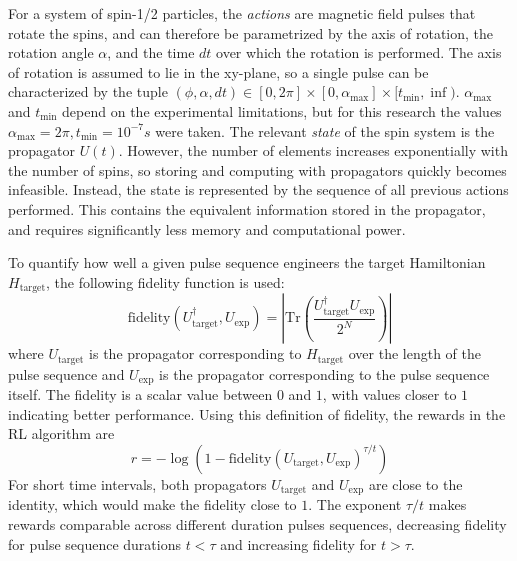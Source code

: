 \documentclass{article}
\begin{document}
For a system of spin-1/2 particles, the \emph{actions} are magnetic field pulses that rotate the spins, and can therefore be parametrized by the axis of rotation, the rotation angle $\alpha$, and the time $dt$ over which the rotation is performed.
The axis of rotation is assumed to lie in the xy-plane, so a single pulse can be characterized by the tuple $(\phi, \alpha, dt) \in [0,2\pi] \times [0, \alpha_\text{max}] \times [t_\text{min}, \inf)$. $\alpha_\text{max}$ and $t_\text{min}$ depend on the experimental limitations, but for this research the values $\alpha_\text{max} = 2\pi, t_\text{min} = 10^{-7}s$ were taken.
The relevant \emph{state} of the spin system is the propagator $U(t)$. However, the number of elements increases exponentially with the number of spins, so storing and computing with propagators quickly becomes infeasible.
Instead, the state is represented by the sequence of all previous actions performed. This contains the equivalent information stored in the propagator, and requires significantly less memory and computational power.

To quantify how well a given pulse sequence engineers the target Hamiltonian $H_\text{target}$, the following fidelity function is used:
\begin{equation}\label{eq:fidelity}
    \text{fidelity}(U_\text{target}^\dagger, U_\text{exp}) = \left| \text{Tr}\left( \frac{U_\text{target}^\dagger U_\text{exp}}{2^N} \right) \right|
\end{equation}
where $U_\text{target}$ is the propagator corresponding to $H_\text{target}$ over the length of the pulse sequence and $U_\text{exp}$ is the propagator corresponding to the pulse sequence itself. The fidelity is a scalar value between $0$ and $1$, with values closer to $1$ indicating better performance. Using this definition of fidelity, the rewards in the RL algorithm are
\begin{equation}\label{eq:rewards}
    r = -\log\left( 1- \text{fidelity}(U_\text{target}, U_\text{exp})^{\tau/t} \right)
\end{equation}
For short time intervals, both propagators $U_\text{target}$ and $U_\text{exp}$ are close to the identity, which would make the fidelity close to $1$. The exponent $\tau/t$ makes rewards comparable across different duration pulses sequences, decreasing fidelity for pulse sequence durations $t<\tau$ and increasing fidelity for $t>\tau$.
\end{document}
